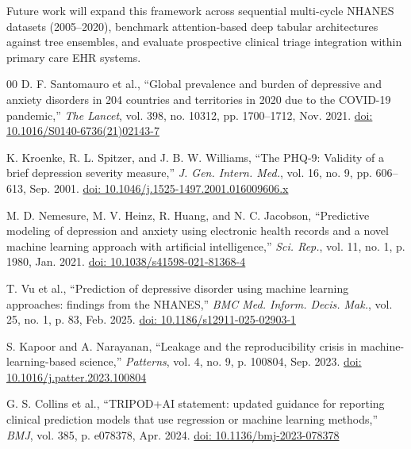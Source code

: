 \documentclass[conference]{IEEEtran}
\begin{document}
Future work will expand this framework across sequential multi-cycle NHANES datasets (2005--2020), benchmark attention-based deep tabular architectures against tree ensembles, and evaluate prospective clinical triage integration within primary care EHR systems.


\begin{thebibliography}{00}
 D. F. Santomauro et al., ``Global prevalence and burden of depressive and anxiety disorders in 204 countries and territories in 2020 due to the COVID-19 pandemic,'' \textit{The Lancet}, vol. 398, no. 10312, pp. 1700--1712, Nov. 2021. \href{https://doi.org/10.1016/S0140-6736(21)02143-7}{doi: 10.1016/S0140-6736(21)02143-7}

 K. Kroenke, R. L. Spitzer, and J. B. W. Williams, ``The PHQ-9: Validity of a brief depression severity measure,'' \textit{J. Gen. Intern. Med.}, vol. 16, no. 9, pp. 606--613, Sep. 2001. \href{https://doi.org/10.1046/j.1525-1497.2001.016009606.x}{doi: 10.1046/j.1525-1497.2001.016009606.x}

 M. D. Nemesure, M. V. Heinz, R. Huang, and N. C. Jacobson, ``Predictive modeling of depression and anxiety using electronic health records and a novel machine learning approach with artificial intelligence,'' \textit{Sci. Rep.}, vol. 11, no. 1, p. 1980, Jan. 2021. \href{https://doi.org/10.1038/s41598-021-81368-4}{doi: 10.1038/s41598-021-81368-4}

 T. Vu et al., ``Prediction of depressive disorder using machine learning approaches: findings from the NHANES,'' \textit{BMC Med. Inform. Decis. Mak.}, vol. 25, no. 1, p. 83, Feb. 2025. \href{https://doi.org/10.1186/s12911-025-02903-1}{doi: 10.1186/s12911-025-02903-1}

 S. Kapoor and A. Narayanan, ``Leakage and the reproducibility crisis in machine-learning-based science,'' \textit{Patterns}, vol. 4, no. 9, p. 100804, Sep. 2023. \href{https://doi.org/10.1016/j.patter.2023.100804}{doi: 10.1016/j.patter.2023.100804}

 G. S. Collins et al., ``TRIPOD+AI statement: updated guidance for reporting clinical prediction models that use regression or machine learning methods,'' \textit{BMJ}, vol. 385, p. e078378, Apr. 2024. \href{https://doi.org/10.1136/bmj-2023-078378}{doi: 10.1136/bmj-2023-078378}


\end{thebibliography}
\end{document}
